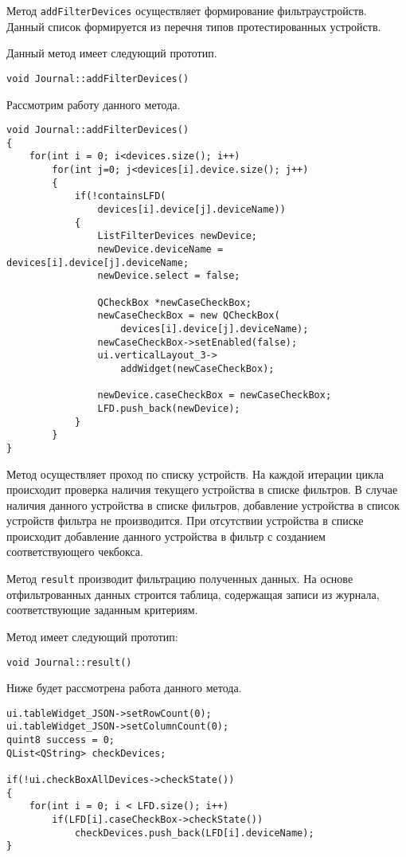 Метод \texttt{addFilterDevices} осуществляет формирование фильтра\break устройств. Данный список формируется из перечня типов
протестированных устройств.

Данный метод
имеет следующий прототип.
\medskip
\begin{verbatim}
void Journal::addFilterDevices()
\end{verbatim}
\medskip

Рассмотрим работу данного метода.
\medskip
\begin{verbatim}
void Journal::addFilterDevices()
{
	for(int i = 0; i<devices.size(); i++)
		for(int j=0; j<devices[i].device.size(); j++)
		{
			if(!containsLFD(
				devices[i].device[j].deviceName))
			{
				ListFilterDevices newDevice;
				newDevice.deviceName = devices[i].device[j].deviceName;
				newDevice.select = false;

				QCheckBox *newCaseCheckBox;
				newCaseCheckBox = new QCheckBox(
					devices[i].device[j].deviceName);
				newCaseCheckBox->setEnabled(false);
				ui.verticalLayout_3->
					addWidget(newCaseCheckBox);

				newDevice.caseCheckBox = newCaseCheckBox;
				LFD.push_back(newDevice);
			}
		}
}
\end{verbatim}
\medskip

Метод осуществляет проход по списку устройств. На каждой итерации цикла происходит проверка наличия текущего устройства в
списке фильтров. В случае наличия данного устройства в списке фильтров, добавление устройства в список устройств
фильтра не производится. При отсутствии устройства в списке происходит добавление данного устройства в фильтр с
созданием соответствующего чекбокса.

Метод \texttt{result} производит фильтрацию полученных данных. На основе отфильтрованных данных строится таблица,
содержащая записи из журнала, соответствующие заданным критериям.

Метод имеет следующий прототип:
\medskip
\begin{verbatim}
void Journal::result()
\end{verbatim}
\medskip

Ниже будет рассмотрена работа данного метода.
\medskip
\begin{verbatim}
ui.tableWidget_JSON->setRowCount(0);
ui.tableWidget_JSON->setColumnCount(0);
quint8 success = 0;
QList<QString> checkDevices;

if(!ui.checkBoxAllDevices->checkState())
{
	for(int i = 0; i < LFD.size(); i++)
		if(LFD[i].caseCheckBox->checkState())
			checkDevices.push_back(LFD[i].deviceName);
}
\end{verbatim}
\medskip

